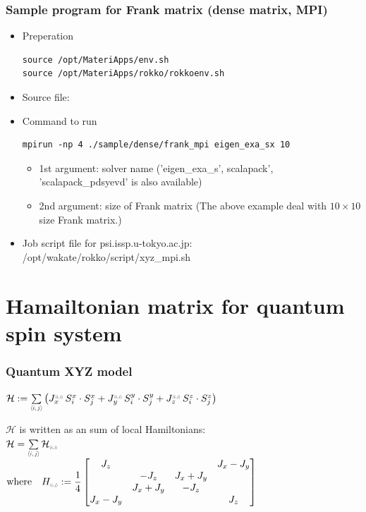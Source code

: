 \begin{frame}[c,fragile]
  \frametitle{Sample program for Frank matrix (dense matrix, MPI)}

  \begin{itemize}
    \item Preperation
\begin{lstlisting}[style=shstyle]
source /opt/MateriApps/env.sh
source /opt/MateriApps/rokko/rokkoenv.sh
\end{lstlisting}
    \item Source file: 
    \item Command to run
\begin{lstlisting}[style=shstyle]
mpirun -np 4 ./sample/dense/frank_mpi eigen_exa_sx 10
\end{lstlisting}
    \begin{itemize}
    \item 1st argument: solver name ('eigen_exa_s', scalapack', 'scalapack_pdsyevd' is also available) \\
    \item 2nd argument: size of Frank matrix (The above example deal with $10\times 10$ size Frank matrix.)
    \end{itemize}
  \item Job script file for psi.issp.u-tokyo.ac.jp:  /opt/wakate/rokko/script/xyz_mpi.sh
  \end{itemize}
\end{frame}


\section{Hamailtonian matrix for quantum spin system}

\begin{frame}[c,fragile]
  \frametitle{Quantum XYZ model}
\setlength{\fboxsep}{1pt}

\noindent
$\mathcal{H}
 := \sum\limits_{\middlescr{{\langle i,j \rangle}}} \left(
  J_x^{\smallscr{\langle i,j \rangle}} \, S^x_i \cdot S^x_j
+ J_y^{\smallscr{\langle i,j \rangle}} \, S^y_i \cdot S^y_j
+ J_z^{\smallscr{\langle i,j \rangle}} \, S^z_i \cdot S^z_j
\right)$

\vspace{1\baselineskip}

\noindent
$\mathcal{H}$ is written as an sum of local Hamiltonians:\\
\noindent
$\mathcal{H} =
\sum\limits_{\middlescr{\langle i,j \rangle}}  \mathcal{H}_{\smallscr{\langle i,j \rangle}}$ \\
$\text{where} \quad  H_{\smallscr{\langle i,j \rangle}} :=
\dfrac{1}{4}
\begin{bmatrix}
J_z & & & J_x-J_y \\
 & - J_z & J_x+J_y & \\
 & J_x+J_y & - J_z & \\
J_x-J_y & & & J_z
\end{bmatrix}$

\end{frame}

